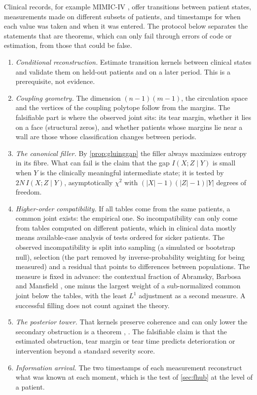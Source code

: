 \documentclass[11pt]{article}
\theoremstyle{definition}
\theoremstyle{remark}
\begin{document}
Clinical records, for example MIMIC-IV \cite{MIMICIV}, offer transitions between patient states, measurements made on different
subsets of patients, and timestamps for when each value was taken and when it was entered. The protocol below separates the
statements that are theorems, which can only fail through errors of code or estimation, from those that could be false.

\begin{enumerate}[leftmargin=*]
\item \emph{Conditional reconstruction.} Estimate transition kernels between clinical states and validate them on held-out patients
  and on a later period. This is a prerequisite, not evidence.
\item \emph{Coupling geometry.} The dimension $(n-1)(m-1)$, the circulation space and the vertices of the coupling polytope follow from
  the margins. The falsifiable part is where the observed joint sits: its tear margin, whether it lies on a face (structural
  zeros), and whether patients whose margins lie near a wall are those whose classification changes between periods.
\item \emph{The canonical filler.} By \cref{prop:gluinggap} the filler always maximizes entropy in its fibre. What can fail is the
  claim that the gap $I(X;Z\mid Y)$ is small when $Y$ is the clinically meaningful intermediate state; it is tested by $2N\,I(X;Z\mid Y)$,
  asymptotically $\chi^2$ with $(\lvert X\rvert-1)(\lvert Z\rvert-1)\lvert Y\rvert$ degrees of freedom.
\item \emph{Higher-order compatibility.} If all tables come from the same patients, a common joint exists: the empirical one. So
  incompatibility can only come from tables computed on different patients, which in clinical data mostly means available-case
  analysis of tests ordered for sicker patients. The observed incompatibility is split into sampling (a simulated or bootstrap null), selection
  (the part removed by inverse-probability weighting for being measured) and a residual that points to differences between
  populations. The measure is fixed in advance: the contextual fraction of Abramsky, Barbosa and Mansfield
  \cite{AbramskyBarbosaMansfield2017}, one minus the largest weight of a sub-normalized common joint below the tables, with the
  least $L^1$ adjustment as a second measure. A successful filling does not count against the theory.
\item \emph{The posterior tower.} That kernels preserve coherence and can only lower the secondary obstruction is a theorem
  \cite[Prop.~9.14]{Tower}, \cite[Prop.~11.5]{Conditionals}. The falsifiable claim is that the estimated obstruction, tear margin or
  tear time predicts deterioration or intervention beyond a standard severity score.
\item \emph{Information arrival.} The two timestamps of each measurement reconstruct what was known at each moment, which is the
  test of \cref{sec:fhub} at the level of a patient.
\end{enumerate}
\end{document}
